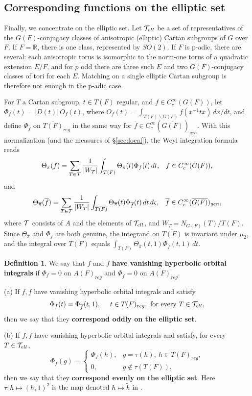 \documentclass[12pt,letterpaper]{book}
\theoremstyle{plain}
\theoremstyle{definition}
\newtheorem{definition}[theorem]{Definition}
\theoremstyle{remark}
\theoremstyle{remark}
\begin{document}
\subsection{Corresponding functions on the elliptic set}\label{sec:elliptic}

Finally, we concentrate on the elliptic set. Let ${\cal T}_{ell}$ be a
set of representatives of the $G(F)$-conjugacy classes of anisotropic
(elliptic) Cartan subgroups of $G$ over $F$. If $F={\mathbb R}$, there is
one class, represented by $SO(2)$. If $F$ is p-adic, there are several:
each anisotropic torus is isomorphic to the norm-one torus of a
quadratic extension $E/F$, and for $p$ odd there are three such $E$ and
two $G(F)$-conjugacy classes of tori for each $E$. Matching on a single
elliptic Cartan subgroup is therefore not enough in the p-adic case.

For $T$ a Cartan subgroup, $t\in T(F)$ regular, and
$f\in C_c^\infty(G(F))$, let $\Phi_f(t)=|D(t)|\,O_f(t)$, where
$O_f(t)=\int_{T(F)\backslash G(F)}f(x^{-1}tx)\,dx/dt$, and define
$\Phi_{\overline{f}}$ on $\overline{T(F)}_{reg}$ in the same way for
$\overline{f}\in C_c^\infty(\overline{G(F)})_{gen}$. With this
normalization (and the measures of \S\ref{sec:local}), the Weyl
integration formula reads
\[
\Theta _{\pi}(f)=\sum_{T\in{\cal T}}\frac 1{|W_T|}\int_{T(F)}\Theta _{\pi}(t)
\Phi_f(t)\,dt,\;\;\;f\in C_c^\infty (G(F)),
\]
and
\[
\Theta _{\overline{\pi } }(\overline{f})
=\sum_{T\in{\cal T}}\frac 1{|W_T|}\int_{\overline{T(F)}}
\Theta _{\overline{\pi } }(t)
\Phi_{\overline{f}}(t)\,dt\,d\varsigma,
\;\;\;\overline{f}\in C_c^\infty (\overline{G(F)})_{gen},
\]
where ${\cal T}$ consists of $A$ and the elements of ${\cal T}_{ell}$,
and $W_T=N_{G(F)}(T)/T(F)$. Since $\Theta_{\overline{\pi}}$ and
$\Phi_{\overline{f}}$ are both genuine, the integrand on
$\overline{T(F)}$ is invariant under $\mu_2$, and the integral over
$\overline{T(F)}$ equals $\int_{T(F)}\Theta_{\overline\pi}(t,1)\Phi_{\overline f}(t,1)\,dt$.

\begin{definition}\label{def:ell-corr}
We say that $f$ and $\overline{f}$ {\bf have vanishing hyperbolic
orbital integrals} if $\Phi_f=0$ on $A(F)_{reg}$ and
$\Phi_{\overline f}=0$ on $\overline{A(F)}_{reg}$.

(a) If $f,\overline{f}$ have vanishing hyperbolic orbital integrals and
satisfy
\[
\Phi_f(t)=\Phi_{\overline{f}}(t,1),\ \ \ \ t\in T(F)_{reg},\ \text{for every } T\in{\cal T}_{ell},
\]
then we say that they \textbf{correspond oddly on the elliptic set}.

(b) If $f,\overline{f}$ have vanishing hyperbolic orbital integrals and
satisfy, for every $T\in{\cal T}_{ell}$,
\[
\Phi_{\overline{f}}(g)
=
\left\{
\begin{array}{ll}
\Phi_f(h), & g=\tau(h),\ h\in T(F)_{reg},\\
0, & g\notin \tau(T(F)),
\end{array}
\right.
\]
then we say that they \textbf{correspond evenly on the elliptic set}.
Here $\tau:h\longmapsto (h,1)^2$ is the map denoted
$h\longmapsto \tilde{h}$ in \cite{Fl}.
\end{definition}
\end{document}
